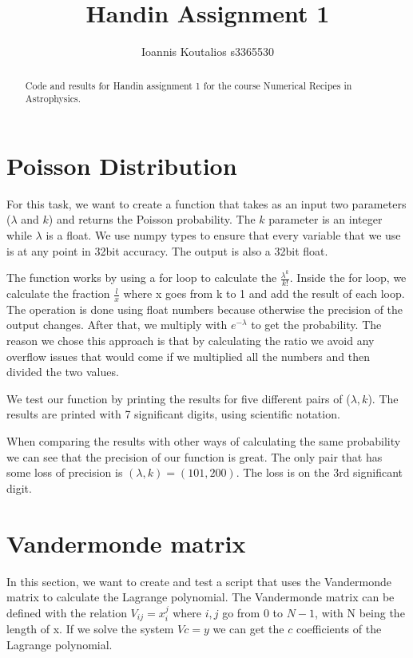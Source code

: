 \documentclass[a4paper,10pt]{article}
\title{Handin Assignment 1}
\author{Ioannis Koutalios s3365530}
\begin{document}
\maketitle

\begin{abstract}
 Code and results for Handin assignment 1 for the course Numerical Recipes in Astrophysics.
\end{abstract}

\section{Poisson Distribution}



For this task, we want to create a function that takes as an input two parameters ($\lambda$ and $k$) and returns the Poisson probability. The $k$ parameter is an integer while $\lambda$ is a float. We use numpy types to ensure that every variable that we use is at any point in 32bit accuracy. The output is also a 32bit float. 

The function works by using a for loop to calculate the $\frac{\lambda^k}{k!}$. Inside the for loop, we calculate the fraction $\frac{l}{x}$ where x goes from k to 1 and add the result of each loop. The operation is done using float numbers because otherwise the precision of the output changes. After that, we multiply with $e^{-\lambda}$ to get the probability. The reason we chose this approach is that by calculating the ratio we avoid any overflow issues that would come if we multiplied all the numbers and then divided the two values. 



We test our function by printing the results for five different pairs of ($\lambda,k$). The results are printed with 7 significant digits, using scientific notation. 

When comparing the results with other ways of calculating the same probability we can see that the precision of our function is great. The only pair that has some loss of precision is $(\lambda,k)= (101,200)$. The loss is on the 3rd significant digit. 

\section{Vandermonde matrix}

In this section, we want to create and test a script that uses the Vandermonde matrix to calculate the Lagrange polynomial. The Vandermonde matrix can be defined with the relation $V_{ij}=x_i^j$ where $i,j$ go from $0$ to $N-1$, with N being the length of x. If we solve the system $Vc=y$ we can get the $c$ coefficients of the Lagrange polynomial. 
\end{document}
